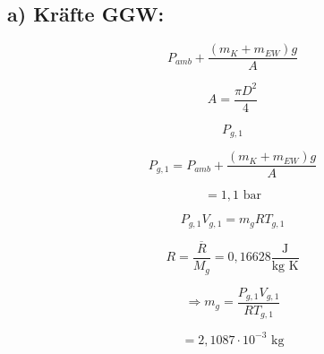 \subsection*{a) Kräfte GGW:}

\[
P_{amb} + \frac{(m_K + m_{EW})g}{A}
\]

\[
A = \frac{\pi D^2}{4}
\]

\[
P_{g,1}
\]

\[
P_{g,1} = P_{amb} + \frac{(m_K + m_{EW})g}{A}
\]

\[
= 1,1 \text{ bar}
\]

\[
P_{g,1} V_{g,1} = m_g R T_{g,1}
\]

\[
R = \frac{\overline{R}}{M_g} = 0,16628 \frac{\text{J}}{\text{kg K}}
\]

\[
\Rightarrow m_g = \frac{P_{g,1} V_{g,1}}{R T_{g,1}}
\]

\[
= 2,1087 \cdot 10^{-3} \text{ kg}
\]